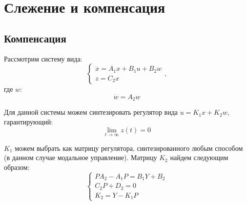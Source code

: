 \section{Слежение и компенсация}
\subsection{Компенсация}
Рассмотрим систему вида:
\begin{equation}
    \begin{cases}
        \dot{x} = A_1x + B_1u + B_2w \\
        z = C_2x
    \end{cases},
\end{equation}
где $w$:
\begin{equation}
    \dot{w} = A_2w
\end{equation}

Для данной системы можем синтезировать регулятор вида $u = K_1x + K_2w$, гарантирующий:
\begin{equation*}
    \lim_{t\to\infty} z(t) = 0
\end{equation*}

$K_1$ можем выбрать как матрицу регулятора, синтезированного любым способом (в данном случае модальное управление). Матрицу $K_2$ найдем следующим образом:
\begin{equation}
    \begin{cases}
        PA_2 - A_1P = B_1Y + B_2\\
        C_2P + D_2 = 0 \\
        K_2 = Y - K_1P
    \end{cases}
\end{equation}

